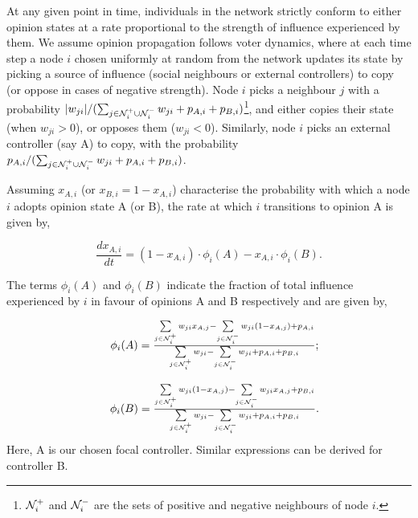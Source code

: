 At any given point in time, individuals in the network strictly conform to either opinion states at a rate proportional to the strength of influence experienced by them. We assume opinion propagation follows voter dynamics, where at each time step a node $i$ chosen uniformly at random from the network updates its state by picking a source of influence (social neighbours or external controllers) to copy (or oppose in cases of negative strength). Node $i$ picks a neighbour $j$ with a probability $|w_{ji}|/(\textstyle\sum_{j \in {\cal N}_{i}^+ \cup {\cal N}_{i}^-} w_{ji} + p_{A,i} + p_{B,i})$\footnote{${\cal N}_{i}^+$ and ${\cal N}_{i}^-$ are the sets of positive and negative neighbours of node $i$.}, and either copies their state (when $w_{ji}>0$), or opposes them ($w_{ji}<0$). Similarly, node $i$ picks an external controller (say A) to copy, with the probability $p_{A,i}/(\textstyle\sum_{j \in {\cal N}_{i}^+ \cup {\cal N}_{i}^-} w_{ji} + p_{A,i} + p_{B,i})$. 





Assuming $x_{A,i}$ (or $x_{B,i} = 1 - x_{A,i}$) characterise the probability with which a node $i$ adopts opinion state A (or B), the rate at which $i$ transitions to opinion A is given by,
 
\begin{equation}
\frac{dx_{A,i}}{dt}=(1-x_{A,i}) \cdot \phi_{i}(A) -x_{A,i} \cdot \phi_{i}(B).
\label{Eq:1}
\end{equation}

The terms $\phi_{i}(A)$ and $\phi_{i}(B)$ indicate the fraction of total influence experienced by $i$ in favour of opinions A and B respectively and are given by,


\begin{align*}
\begin{array}{cc}
     & \phi_{i}(A) = \frac{\sum\limits_{j \in {\cal N}_i^+} w_{ji}x_{A,j}-\sum\limits_{j \in {\cal N}_i^-} w_{ji}(1-x_{A,j})+p_{A,i}}{\sum\limits_{j \in {\cal N}_i^+} w_{ji}-\sum\limits_{j \in {\cal N}_i^-} w_{ji}+p_{A,i}+p_{B,i}}; \\ \\
     & \phi_{i}(B) = \frac{\sum\limits_{j \in {\cal N}_i^+} w_{ji}(1-x_{A,j})-\sum\limits_{j \in{\cal N}_i^-} w_{ji}x_{A,j}+p_{B,i}}{\sum\limits_{j \in{\cal N}_i^+} w_{ji}-\sum\limits_{j \in {\cal N}_i^-} w_{ji}+p_{A,i}+p_{B,i}}.
\end{array}
\end{align*}
Here, A is our chosen focal controller. Similar expressions can be derived for controller B.

